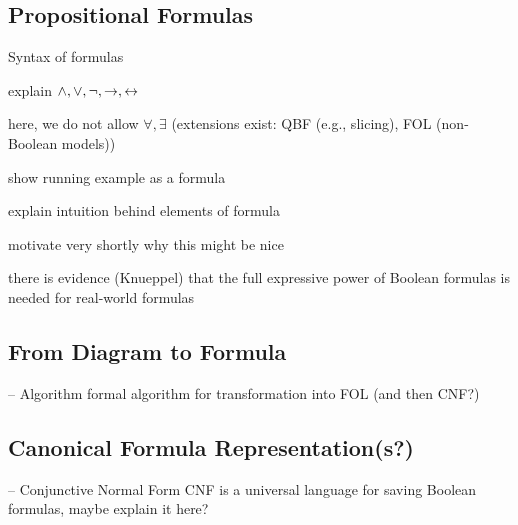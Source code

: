 



\subsection{Propositional Formulas}

\begin{frame}{\insertsubsection}
	Syntax of formulas

	explain $\wedge, \vee, \neg, \rightarrow, \leftrightarrow$

	here, we do not allow $\forall, \exists$ (extensions exist: QBF (e.g., slicing), FOL (non-Boolean models))
\end{frame}

\begin{frame}{\insertsubsection}
	show running example as a formula
	
	explain intuition behind elements of formula

	motivate very shortly why this might be nice

	there is evidence (Knueppel) that the full expressive power of Boolean formulas is needed for real-world formulas
\end{frame}

\subsection{From Diagram to Formula}

\begin{frame}{-- Algorithm}
	formal algorithm for transformation into FOL (and then CNF?)
\end{frame}

\subsection{Canonical Formula Representation(s?)}

\begin{frame}{-- Conjunctive Normal Form}
	CNF is a universal language for saving Boolean formulas, maybe explain it here?
\end{frame}

